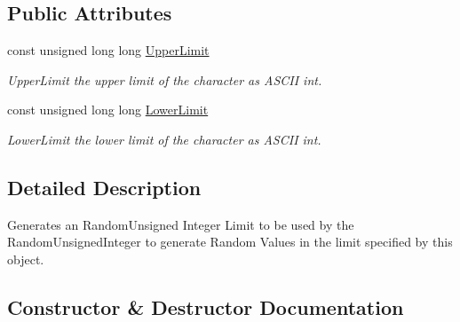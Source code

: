 \subsection*{Public Attributes}
\begin{DoxyCompactItemize}
\item 
\mbox{\label{classtestcaser_1_1maker_1_1RandomUnsignedIntegerLimit_a02335f6ed09e057b47b5c40b584c71fe}} 
const unsigned long long \hyperlink{classtestcaser_1_1maker_1_1RandomUnsignedIntegerLimit_a02335f6ed09e057b47b5c40b584c71fe}{Upper\+Limit}
\begin{DoxyCompactList}\small\item\em Upper\+Limit the upper limit of the character as A\+S\+C\+II int. \end{DoxyCompactList}\item 
\mbox{\label{classtestcaser_1_1maker_1_1RandomUnsignedIntegerLimit_a78c820c6fa2a1e136a71141f5697ff7f}} 
const unsigned long long \hyperlink{classtestcaser_1_1maker_1_1RandomUnsignedIntegerLimit_a78c820c6fa2a1e136a71141f5697ff7f}{Lower\+Limit}
\begin{DoxyCompactList}\small\item\em Lower\+Limit the lower limit of the character as A\+S\+C\+II int. \end{DoxyCompactList}\end{DoxyCompactItemize}


\subsection{Detailed Description}
Generates an Random\+Unsigned Integer Limit to be used by the Random\+Unsigned\+Integer to generate Random Values in the limit specified by this object. 

\subsection{Constructor \& Destructor Documentation}
\mbox{\label{classtestcaser_1_1maker_1_1RandomUnsignedIntegerLimit_a8535b952828f59d17c69caae62f4c4e1}} 
